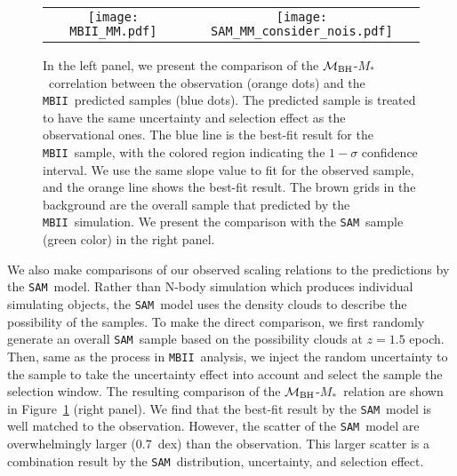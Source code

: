 \documentclass{natureprintstyle}
\newcommand{\mbh}{$\mathcal M_{\rm BH}$}
\newcommand{\mstar}{{$M_*$}}
\newcommand{\sam}{\texttt{SAM}}
\newcommand{\mbii}{\texttt{MBII}}
\newcommand{\ding}[1]{\textcolor{red}{[{\bf Xuheng}: #1]}}
\begin{document}
\begin{figure*}[t]%
\begin{tabular}{c c}
\texttt{[image: MBII\_MM.pdf]} &
\texttt{[image: SAM\_MM\_consider\_nois.pdf]} \\
\end{tabular}
\caption{In the left panel, we present the comparison of the  \mbh-\mstar\ correlation between the observation (orange dots) and the \mbii\ predicted samples (blue dots). The predicted sample is treated to have the same uncertainty and selection effect as the observational ones. The blue line is the best-fit result for the \mbii\ sample, with the colored region indicating the $1-\sigma$ confidence interval. We use the same slope value to fit for the observed sample, and the orange line shows the best-fit result. The brown grids in the background are the overall sample that predicted by the \mbii\ simulation. We present the comparison with the \sam\ sample (green color) in the right panel.
}
\label{fig:MM_comp}
\end{figure*}

We also make comparisons of our observed scaling relations to the predictions by the \sam\ model. Rather than N-body simulation which produces individual simulating objects, the \sam\ model uses the density clouds to describe the possibility of the samples. 
To make the direct comparison, we first randomly generate an overall \sam\ sample based on the possibility clouds at $z=1.5$ epoch. Then, same as the process in \mbii\ analysis, we inject the random uncertainty to the sample to take the uncertainty effect into account and select the sample the selection window. The resulting comparison of the  \mbh-\mstar\ relation are shown in Figure~\ref{fig:MM_comp} (right panel). We find that the best-fit result by the \sam\ model is well matched to the observation. However, the scatter of the \sam\ model are overwhelmingly larger ($0.7$~dex) than the observation. This larger scatter is a combination result by the \sam\ distribution, uncertainty, and selection effect.  
\end{document}
